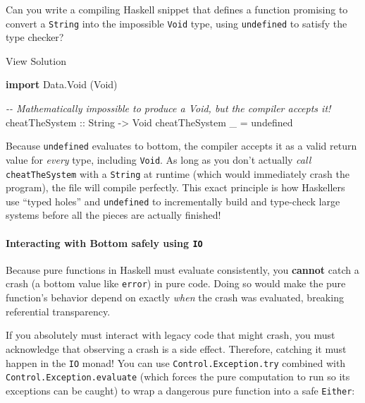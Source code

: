 \documentclass[
]{article}
\newenvironment{Shaded}{}{}
\newcommand{\CommentTok}[1]{\textcolor[rgb]{0.38,0.63,0.69}{\textit{#1}}}
\newcommand{\DataTypeTok}[1]{\textcolor[rgb]{0.56,0.13,0.00}{#1}}
\newcommand{\FunctionTok}[1]{\textcolor[rgb]{0.02,0.16,0.49}{#1}}
\newcommand{\KeywordTok}[1]{\textcolor[rgb]{0.00,0.44,0.13}{\textbf{#1}}}
\newcommand{\NormalTok}[1]{#1}
\newcommand{\OtherTok}[1]{\textcolor[rgb]{0.00,0.44,0.13}{#1}}
\begin{document}
Can you write a compiling Haskell snippet that defines a function
promising to convert a \texttt{String} into the impossible \texttt{Void}
type, using \texttt{undefined} to satisfy the type checker?

View Solution

\begin{Shaded}
\begin{Highlighting}[]
\KeywordTok{import} \DataTypeTok{Data.Void}\NormalTok{ (}\DataTypeTok{Void}\NormalTok{)}

\CommentTok{{-}{-} Mathematically impossible to produce a Void, but the compiler accepts it!}
\OtherTok{cheatTheSystem ::} \DataTypeTok{String} \OtherTok{{-}\textgreater{}} \DataTypeTok{Void}
\NormalTok{cheatTheSystem \_ }\OtherTok{=} \FunctionTok{undefined}
\end{Highlighting}
\end{Shaded}

Because \texttt{undefined} evaluates to bottom, the compiler accepts it
as a valid return value for \emph{every} type, including \texttt{Void}.
As long as you don't actually \emph{call} \texttt{cheatTheSystem} with a
\texttt{String} at runtime (which would immediately crash the program),
the file will compile perfectly. This exact principle is how Haskellers
use ``typed holes'' and \texttt{undefined} to incrementally build and
type-check large systems before all the pieces are actually finished!

\paragraph{\texorpdfstring{Interacting with Bottom safely using
\texttt{IO}}{Interacting with Bottom safely using IO}}\label{interacting-with-bottom-safely-using-io}

Because pure functions in Haskell must evaluate consistently, you
\textbf{cannot} catch a crash (a bottom value like \texttt{error}) in
pure code. Doing so would make the pure function's behavior depend on
exactly \emph{when} the crash was evaluated, breaking referential
transparency.

If you absolutely must interact with legacy code that might crash, you
must acknowledge that observing a crash is a side effect. Therefore,
catching it must happen in the \texttt{IO} monad! You can use
\texttt{Control.Exception.try} combined with
\texttt{Control.Exception.evaluate} (which forces the pure computation
to run so its exceptions can be caught) to wrap a dangerous pure
function into a safe \texttt{Either}:
\end{document}
